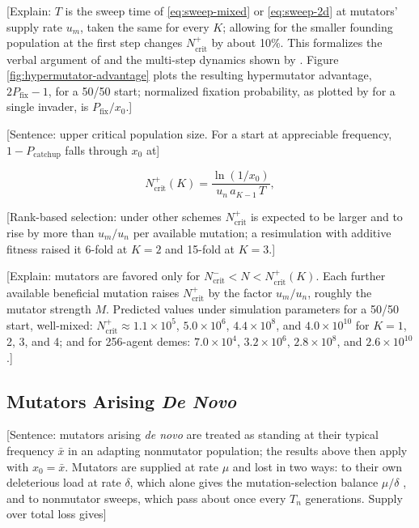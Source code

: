 [Explain: $T$ is the sweep time of \cref{eq:sweep-mixed} or \cref{eq:sweep-2d} at mutators' supply rate $u_m$, taken the same for every $K$; allowing for the smaller founding population at the first step changes $N_\mathrm{crit}^{+}$ by about 10\%.
This formalizes the verbal argument of \citet{desai2011balance} and the multi-step dynamics shown by \citet{tanaka2003evolution,tenaillon1999mutators}.
Figure \ref{fig:hypermutator-advantage} plots the resulting hypermutator advantage, $2 P_\mathrm{fix} - 1$, for a 50/50 start; normalized fixation probability, as plotted by \citet{raynes2018sign} for a single invader, is $P_\mathrm{fix} / x_0$.]

[Sentence: upper critical population size. For a start at appreciable frequency, $1 - P_\mathrm{catchup}$ falls through $x_0$ at]

\begin{equation}
  N_\mathrm{crit}^{+}(K) = \frac{\ln(1 / x_0)}{u_n\, a_{K-1}\, T}, \label{eq:ncrit-upper}
\end{equation}

[Rank-based selection: under other schemes $N_\mathrm{crit}^{+}$ is expected to be larger and to rise by more than $u_m / u_n$ per available mutation; a resimulation with additive fitness raised it 6-fold at $K = 2$ and 15-fold at $K = 3$.]

[Explain: mutators are favored only for $N_\mathrm{crit}^{-} < N < N_\mathrm{crit}^{+}(K)$.
Each further available beneficial mutation raises $N_\mathrm{crit}^{+}$ by the factor $u_m / u_n$, roughly the mutator strength $M$.
Predicted values under simulation parameters for a 50/50 start, well-mixed: $N_\mathrm{crit}^{+} \approx 1.1 \times 10^5$, $5.0 \times 10^6$, $4.4 \times 10^8$, and $4.0 \times 10^{10}$ for $K = 1$, 2, 3, and 4; and for 256-agent demes: $7.0 \times 10^4$, $3.2 \times 10^6$, $2.8 \times 10^8$, and $2.6 \times 10^{10}$.]

\subsection{Mutators Arising \textit{De Novo}} \label{sec:model:denovo}

[Sentence: mutators arising \textit{de novo} are treated as standing at their typical frequency $\bar{x}$ in an adapting nonmutator population; the results above then apply with $x_0 = \bar{x}$.
Mutators are supplied at rate $\mu$ and lost in two ways: to their own deleterious load at rate $\delta$, which alone gives the mutation-selection balance $\mu / \delta$ \citep{johnson1999approach}, and to nonmutator sweeps, which pass about once every $T_n$ generations. Supply over total loss gives]

